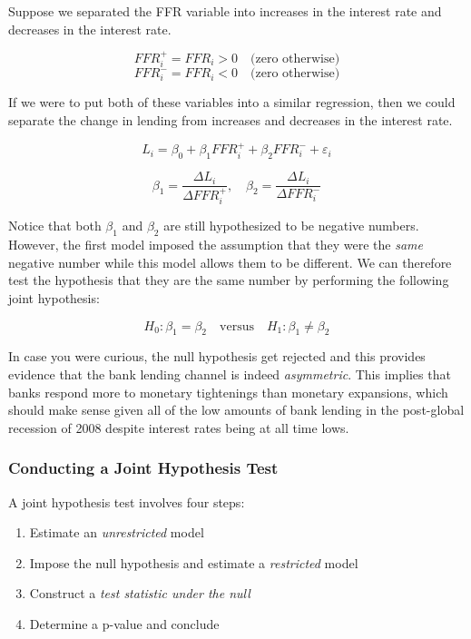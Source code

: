 \documentclass[
]{book}
\begin{document}
Suppose we separated the FFR variable into increases in the interest rate and decreases in the interest rate.

\[FFR_i^+ = FFR_i >0 \quad \text{(zero otherwise)}\]
\[FFR_i^- = FFR_i <0 \quad \text{(zero otherwise)}\]

If we were to put both of these variables into a similar regression, then we could separate the change in lending from increases and decreases in the interest rate.

\[L_i = \beta_0 + \beta_1 FFR_i^+ + \beta_2 FFR_i^- + \varepsilon_i\]

\[\beta_1 = \frac{\Delta L_i}{\Delta FFR_i^+}, \quad \beta_2 = \frac{\Delta L_i}{\Delta FFR_i^-}\]

Notice that both \(\beta_1\) and \(\beta_2\) are still hypothesized to be negative numbers. However, the first model imposed the assumption that they were the \emph{same} negative number while this model allows them to be different. We can therefore test the hypothesis that they are the same number by performing the following joint hypothesis:

\[H_0: \beta_1=\beta_2 \quad \text{versus} \quad H_1: \beta_1 \neq \beta_2\]

In case you were curious, the null hypothesis get rejected and this provides evidence that the bank lending channel is indeed \emph{asymmetric}. This implies that banks respond more to monetary tightenings than monetary expansions, which should make sense given all of the low amounts of bank lending in the post-global recession of 2008 despite interest rates being at all time lows.

\hypertarget{conducting-a-joint-hypothesis-test}{%
\subsubsection*{Conducting a Joint Hypothesis Test}\label{conducting-a-joint-hypothesis-test}}

A joint hypothesis test involves four steps:

\begin{enumerate}
\def\labelenumi{\arabic{enumi}.}
\item
  Estimate an \emph{unrestricted} model
\item
  Impose the null hypothesis and estimate a \emph{restricted} model
\item
  Construct a \emph{test statistic under the null}
\item
  Determine a p-value and conclude
\end{enumerate}
\end{document}
